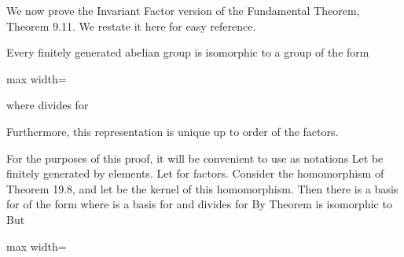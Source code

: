 \documentclass[11pt,oneside]{article}
\begin{document}
\begin{BookBody}
We now prove the Invariant Factor version of the Fundamental Theorem, Theorem 9.11. We restate it here for easy reference.

 Every finitely generated abelian group is isomorphic to a group of the form

\begin{center}\begin{adjustbox}{max width=\linewidth}\end{adjustbox}\end{center}

\noindent where  divides  for 

\noindent Furthermore, this representation is unique up to order of the factors.

 For the purposes of this proof, it will be convenient to use as notations   Let  be finitely generated by  elements. Let  for  factors. Consider the homomorphism  of Theorem 19.8, and let  be the kernel of this homomorphism. Then there is a basis for  of the form  where  is a basis for  and  divides  for  By Theorem  is isomorphic to  But

\begin{center}\begin{adjustbox}{max width=\linewidth}\end{adjustbox}\end{center}


\end{BookBody}
\end{document}
